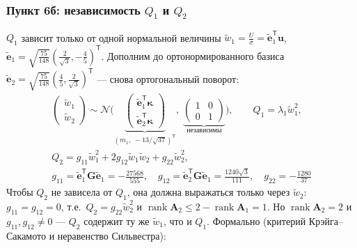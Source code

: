 \documentclass[12pt]{spbstu-task}
\begin{document}
\subsubsection*{Пункт 6б: независимость \(Q_1\) и \(Q_2\)}
\(Q_1\) зависит только от одной нормальной величины \(\tilde{w}_1 = \frac{U}{\sigma} = \tilde{\mathbf{e}}_1^\mathsf{T}\mathbf{u}\),
\(\tilde{\mathbf{e}}_1 = \sqrt{\tfrac{75}{148}}\left(\tfrac{2}{\sqrt{3}}, -\tfrac{4}{5}\right)^\mathsf{T}\).
Дополним до ортонормированного базиса \(\tilde{\mathbf{e}}_2 = \sqrt{\tfrac{75}{148}}\left(\tfrac{4}{5}, \tfrac{2}{\sqrt{3}}\right)^\mathsf{T}\) --- снова ортогональный поворот:
\begin{gather*}
  \begin{pmatrix} \tilde{w}_1 \\ \tilde{w}_2 \end{pmatrix}\sim\mathcal{N}\Biggl(
  \underbrace{\begin{pmatrix} \tilde{\mathbf{e}}_1^\mathsf{T}\boldsymbol{\kappa} \\ \tilde{\mathbf{e}}_2^\mathsf{T}\boldsymbol{\kappa} \end{pmatrix}}_{(m_1,\;-13/\sqrt{37})^\mathsf{T}},\;
  \underbrace{\begin{pmatrix} 1 & 0 \\ 0 & 1 \end{pmatrix}}_{\text{независимы}}\Biggr),\qquad
  Q_1 = \lambda_1\tilde{w}_1^2, \\
  Q_2 = g_{11}\tilde{w}_1^2 + 2g_{12}\tilde{w}_1\tilde{w}_2 + g_{22}\tilde{w}_2^2, \\
  g_{11} = \tilde{\mathbf{e}}_1^\mathsf{T}\mathbf{G}\tilde{\mathbf{e}}_1 = -\frac{27568}{555},\quad
  g_{12} = \tilde{\mathbf{e}}_2^\mathsf{T}\mathbf{G}\tilde{\mathbf{e}}_1 = \frac{1240\sqrt{3}}{111},\quad
  g_{22} = -\frac{1280}{37}
\end{gather*}
Чтобы \(Q_2\) не зависела от \(Q_1\), она должна выражаться только через \(\tilde{w}_2\):
\(g_{11} = g_{12} = 0\), т.е.\ \(Q_2 = g_{22}\tilde{w}_2^2\) и \(\operatorname{rank}\mathbf{A}_2 \leq 2 - \operatorname{rank}\mathbf{A}_1 = 1\).
Но \(\operatorname{rank}\mathbf{A}_2 = 2\) и \(g_{11}, g_{12}\neq 0\) --- \(Q_2\) содержит ту же \(\tilde{w}_1\), что и \(Q_1\).
Формально (критерий Крэйга--Сакамото и неравенство Сильвестра):
\end{document}
